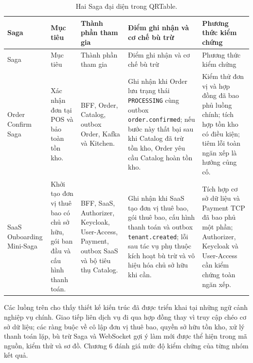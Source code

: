 {\scriptsize\sloppy
\setlength{\tabcolsep}{2pt}
\begin{longtable}{>{\raggedright\arraybackslash}p{}>{\raggedright\arraybackslash}p{}>{\raggedright\arraybackslash}p{}>{\raggedright\arraybackslash}p{}>{\raggedright\arraybackslash}p{}}
  \caption{Hai Saga đại diện trong QRTable.}
  \label{tab:chapter5-representative-sagas}\\
  \toprule
  Saga & Mục tiêu & Thành phần tham gia & Điểm ghi nhận và cơ chế bù trừ & Phương thức kiểm chứng \\
  \midrule
  \endfirsthead
  \toprule
  Saga & Mục tiêu & Thành phần tham gia & Điểm ghi nhận và cơ chế bù trừ & Phương thức kiểm chứng \\
  \midrule
  \endhead
  \bottomrule
  \endfoot
  Order Confirm Saga & Xác nhận đơn tại POS và bảo toàn tồn kho. & BFF, Order, Catalog, outbox Order, Kafka và Kitchen. & Ghi nhận khi Order lưu trạng thái \texttt{PROCESSING} cùng outbox \texttt{order.confirmed}; nếu bước này thất bại sau khi Catalog đã trừ tồn kho, Order yêu cầu Catalog hoàn tồn kho. & Kiểm thử đơn vị và hợp đồng đã bao phủ luồng chính; tích hợp tồn kho có điều kiện; tiêm lỗi toàn ngăn xếp là hướng củng cố. \\
  SaaS Onboarding Mini-Saga & Khởi tạo đơn vị thuê bao có chủ sở hữu, gói ban đầu và cấu hình thanh toán. & BFF, SaaS, Authorizer, Keycloak, User-Access, Payment, outbox SaaS và bộ tiêu thụ Catalog. & Ghi nhận khi SaaS tạo đơn vị thuê bao, gói thuê bao, cấu hình thanh toán và outbox \texttt{tenant.created}; lỗi sau tác vụ phụ thuộc kích hoạt bù trừ và vô hiệu hóa chủ sở hữu khi cần. & Tích hợp cơ sở dữ liệu và Payment TCP đã bao phủ một phần; Authorizer, Keycloak và User-Access cần kiểm chứng toàn ngăn xếp. \\
\end{longtable}
}

Các luồng trên cho thấy thiết kế kiến trúc đã được triển khai tại những ngữ cảnh nghiệp vụ chính. Giao tiếp liên dịch vụ đi qua hợp đồng thay vì truy cập chéo cơ sở dữ liệu; các ràng buộc về cô lập đơn vị thuê bao, quyền sở hữu tồn kho, xử lý thanh toán lặp, bù trừ Saga và WebSocket gợi ý làm mới được thể hiện trong mã nguồn, kiểm thử và sơ đồ. Chương 6 đánh giá mức độ kiểm chứng của từng nhóm kết quả.
